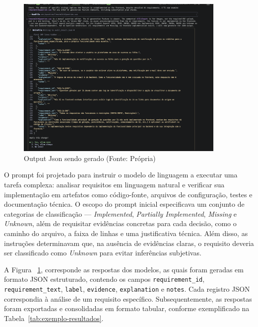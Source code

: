 \begin{figure}[H]
    \centering
    \includegraphics[width=0.9\textwidth]{imgs/jsongGeneration.png}
    \caption{Output Json sendo gerado  (Fonte: Própria)}
    \label{fig:json_prompt}
\end{figure}

O prompt foi projetado para instruir o modelo de linguagem a executar uma tarefa complexa: analisar requisitos em linguagem natural e verificar sua implementação em artefatos como código-fonte, arquivos de configuração, testes e documentação técnica. O escopo do prompt inicial especificava um conjunto de categorias de classificação — \textit{Implemented}, \textit{Partially Implemented}, \textit{Missing} e \textit{Unknown}, além de requisitar evidências concretas para cada decisão, como o caminho do arquivo, a faixa de linhas e uma justificativa técnica. Além disso, as instruções determinavam que, na ausência de evidências claras, o requisito deveria ser classificado como \textit{Unknown} para evitar inferências subjetivas. 


A Figura ~\ref{fig:json_prompt}, corresponde as respostas dos modelos, as quais foram geradas em formato JSON estruturado, contendo os campos \texttt{requirement\_id}, \texttt{requirement\_text}, \texttt{label}, \texttt{evidence}, \texttt{explanation} e \texttt{notes}. Cada registro JSON correspondia à análise de um requisito específico. Subsequentemente, as respostas foram exportadas e consolidadas em formato tabular, conforme exemplificado na Tabela~\ref{tab:exemplo-resultados}. 



